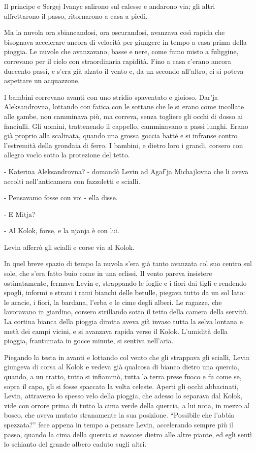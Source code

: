 Il principe e Sergej Ivanyc salirono sul calesse e andarono via; gli altri affrettarono il passo, ritornarono a casa a piedi. 

Ma la nuvola ora sbiancandosi, ora oscurandosi, avanzava così rapida che bisognava accelerare ancora di velocità per giungere in tempo a casa prima della pioggia. Le nuvole che avanzavano, basse e nere, come fumo misto a fuliggine, correvano per il cielo con straordinaria rapidità. Fino a casa c'erano ancora duecento passi, e s'era già alzato il vento e, da un secondo all'altro, ci si poteva aspettare un acquazzone. 

I bambini correvano avanti con uno stridio spaventato e gioioso. Dar'ja Aleksandrovna, lottando con fatica con le sottane che le si erano come incollate alle gambe, non camminava più, ma correva, senza togliere gli occhi di dosso ai fanciulli. Gli uomini, trattenendo il cappello, camminavano a passi lunghi. Erano già proprio alla scalinata, quando una grossa goccia batté e si infranse contro l'estremità della grondaia di ferro. I bambini, e dietro loro i grandi, corsero con allegro vocìo sotto la protezione del tetto. 

- Katerina Aleksandrovna? - domandò Levin ad Agaf'ja Michajlovna che li aveva accolti nell'anticamera con fazzoletti e scialli. 

- Pensavamo fosse con voi - ella disse. 

- E Mitja? 

- Al Kolok, forse, e la njanja è con lui. 

Levin afferrò gli scialli e corse via al Kolok. 

In quel breve spazio di tempo la nuvola s'era già tanto avanzata col suo centro sul sole, che s'era fatto buio come in una eclissi. Il vento pareva insistere ostinatamente, fermava Levin e, strappando le foglie e i fiori dai tigli e rendendo spogli, informi e strani i rami bianchi delle betulle, piegava tutto da un sol lato: le acacie, i fiori, la bardana, l'erba e le cime degli alberi. Le ragazze, che lavoravano in giardino, corsero strillando sotto il tetto della camera della servitù. La cortina bianca della pioggia dirotta aveva già invaso tutta la selva lontana e metà dei campi vicini, e si avanzava rapida verso il Kolok. L'umidità della pioggia, frantumata in gocce minute, si sentiva nell'aria. 

Piegando la testa in avanti e lottando col vento che gli strappava gli scialli, Levin giungeva di corsa al Kolok e vedeva già qualcosa di bianco dietro una quercia, quando, a un tratto, tutto si infiammò, tutta la terra prese fuoco e fu come se, sopra il capo, gli si fosse spaccata la volta celeste. Aperti gli occhi abbacinati, Levin, attraverso lo spesso velo della pioggia, che adesso lo separava dal Kolok, vide con orrore prima di tutto la cima verde della quercia, a lui nota, in mezzo al bosco, che aveva mutato stranamente la sua posizione. ``Possibile che l'abbia spezzata?'' fece appena in tempo a pensare Levin, accelerando sempre più il passo, quando la cima della quercia si nascose dietro alle altre piante, ed egli sentì lo schianto del grande albero caduto sugli altri. 

